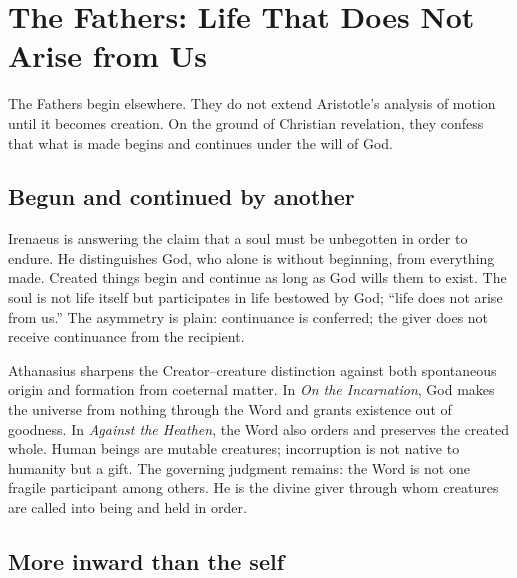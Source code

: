 \section{The Fathers: Life That Does Not Arise from Us}

The Fathers begin elsewhere. They do not extend Aristotle's analysis of motion until it becomes creation. On the ground of Christian revelation, they confess that what is made begins and continues under the will of God.

\subsection{Begun and continued by another}

Irenaeus is answering the claim that a soul must be unbegotten in order to endure. He distinguishes God, who alone is without beginning, from everything made. Created things begin and continue as long as God wills them to exist. The soul is not life itself but participates in life bestowed by God; ``life does not arise from us.'' The asymmetry is plain: continuance is conferred; the giver does not receive continuance from the recipient.

Athanasius sharpens the Creator--creature distinction against both spontaneous origin and formation from coeternal matter. In \emph{On the Incarnation}, God makes the universe from nothing through the Word and grants existence out of goodness. In \emph{Against the Heathen}, the Word also orders and preserves the created whole. Human beings are mutable creatures; incorruption is not native to humanity but a gift. The governing judgment remains: the Word is not one fragile participant among others. He is the divine giver through whom creatures are called into being and held in order.

\subsection{More inward than the self}

